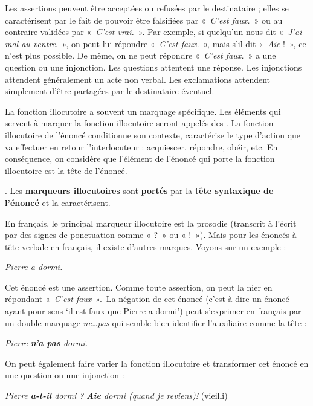 Les assertions peuvent être acceptées ou refusées par le destinataire ; elles se caractérisent par le fait de pouvoir être falsifiées par «~\textit{C’est faux.}~» ou au contraire validées par «~\textit{C’est vrai.}~». Par exemple, si quelqu’un nous dit «~\textit{J’ai mal au ventre}.~», on peut lui répondre «~\textit{C’est faux.}~», mais s’il dit «~\textit{Aie} !~», ce n’est plus possible. De même, on ne peut répondre «~\textit{C’est faux.}~» a une question ou une injonction. Les questions attentent une réponse. Les injonctions attendent généralement un acte non verbal. Les exclamations attendent simplement d’être partagées par le destinataire éventuel.

La fonction illocutoire a souvent un marquage spécifique. Les éléments qui servent à marquer la fonction illocutoire seront appelés des . La fonction illocutoire de l'énoncé conditionne son contexte, caractérise le type d'action que va effectuer en retour l'interlocuteur : acquiescer, répondre, obéir, etc. En conséquence, on considère que l'élément de l'énoncé qui porte la fonction illocutoire est la tête de l'énoncé.

{. Les \textbf{marqueurs illocutoires} sont \textbf{portés} par la \textbf{tête syntaxique de l’énoncé} et la caractérisent.}

En français, le principal marqueur illocutoire est la prosodie (transcrit à l’écrit par des signes de ponctuation comme « ?~» ou « !~»). Mais pour les énoncés à tête verbale en français, il existe d’autres marques. Voyons sur un exemple :

\ea
\textit{{Pierre a dormi}.}
\z

Cet énoncé est une assertion. Comme toute assertion, on peut la nier en répondant «~\textit{C’est faux}~».~La négation de cet énoncé (c'est-à-dire un énoncé ayant pour sens ‘il est faux que Pierre a dormi’) peut s’exprimer en français par un double marquage \textit{ne…pas} qui semble bien identifier l’auxiliaire comme la tête :

\ea
\textit{{Pierre} \textbf{{n’a}  {pas}}  {dormi.}}
\z

On peut également faire varier la fonction illocutoire et transformer cet énoncé en une question ou une injonction :

\ea
  \ea \textit{Pierre \textbf{a-t-il} dormi ?}
  \ex \textit{\textbf{Aie}  dormi (quand  je reviens)!} (vieilli)
  \z
\z

